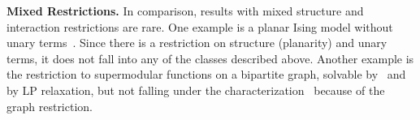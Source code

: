 %
%


\textbf{Mixed Restrictions.}
In comparison, results with mixed structure and interaction restrictions are rare. One example is a planar Ising model without unary terms~\cite{Shih-90}. Since there is a restriction on structure (planarity) and unary terms, it does not fall into any of the classes described above. 
Another example is the restriction to supermodular functions on a bipartite graph, solvable by~\cite{DSchlesinger-07-permuted} and by LP relaxation, but not falling under the characterization~\cite{Thapper-13} because of the graph restriction. %

